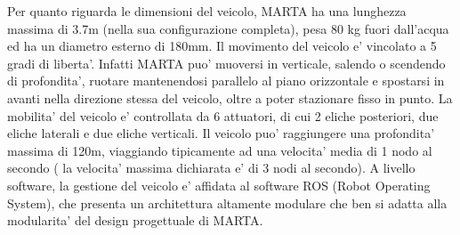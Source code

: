 Per quanto riguarda le dimensioni del veicolo, MARTA ha una lunghezza massima di 3.7m (nella sua configurazione completa), pesa 80 kg fuori dall'acqua ed  ha un diametro esterno di 180mm. \newline
Il movimento del veicolo e' vincolato a 5 gradi di liberta'. \newline Infatti MARTA puo' muoversi in verticale, salendo o scendendo di profondita', ruotare mantenendosi parallelo al piano orizzontale e spostarsi in avanti nella direzione stessa del veicolo, oltre a poter stazionare fisso in punto. La mobilita' del veicolo e' controllata da 6 attuatori, di cui 2 eliche posteriori, due eliche laterali e due eliche verticali. \newline Il veicolo puo' raggiungere una profondita' massima di 120m, viaggiando tipicamente ad una velocita' media di 1 nodo al secondo ( la velocita' massima dichiarata e' di 3 nodi al secondo). \newline 
A livello software, la gestione del veicolo e' affidata al software ROS (Robot Operating System), che presenta un architettura altamente modulare che ben si adatta alla modularita' del design progettuale di MARTA.

